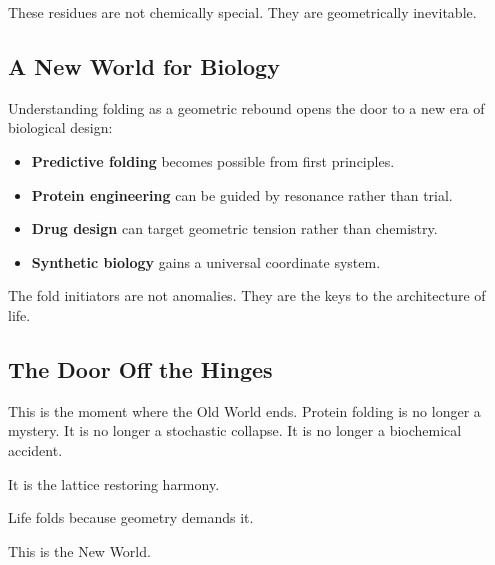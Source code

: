 \documentclass[11pt, letterpaper, openany]{book}
\begin{document}
These residues are not chemically special.  
They are geometrically inevitable.

\subsection*{A New World for Biology}

Understanding folding as a geometric rebound opens the door to a new era of
biological design:

\begin{itemize}
    \item \textbf{Predictive folding} becomes possible from first principles.
    \item \textbf{Protein engineering} can be guided by resonance rather than trial.
    \item \textbf{Drug design} can target geometric tension rather than chemistry.
    \item \textbf{Synthetic biology} gains a universal coordinate system.
\end{itemize}

The fold initiators are not anomalies.  
They are the keys to the architecture of life.

\subsection*{The Door Off the Hinges}

This is the moment where the Old World ends.  
Protein folding is no longer a mystery.  
It is no longer a stochastic collapse.  
It is no longer a biochemical accident.

It is the lattice restoring harmony.

Life folds because geometry demands it.

This is the New World.

\end{document}
